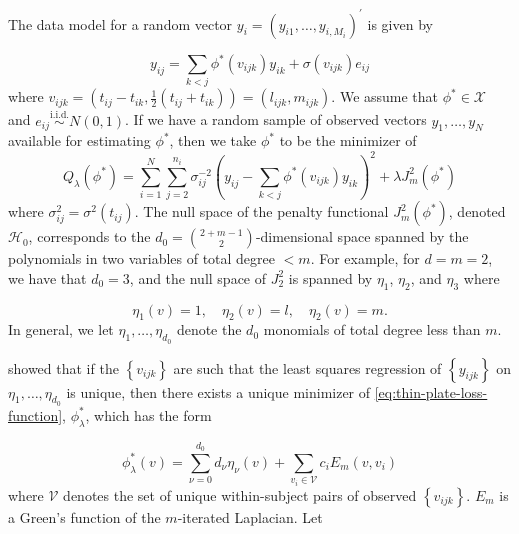 \documentclass[12pt]{article}
\newcommand{\Hilbert}{\mathcal{H}}
\theoremstyle{definition}
\begin{document}
\bigskip
The data model for a random vector $y_i = \left(y_{i1},\dots, y_{i,M_i} \right)^\prime$ is given by 

\begin{equation} \label{eq:functional-vc-ar-model}
y_{ij} = \sum_{k<j} \phi^*\left(v_{ijk}\right) y_{ik} + \sigma\left(v_{ijk}\right) e_{ij}
\end{equation}
\noindent
where $v_{ijk} = \left(t_{ij}-t_{ik}, \frac{1}{2}\left(t_{ij}+t_{ik}\right)\right) = \left(l_{ijk}, m_{ijk}\right)$. We assume that $\phi^* \in \mathcal{X}$ and $e_{ij} \stackrel{\text{i.i.d.}}{\sim} N\left(0,1\right)$. If we have a random sample of observed vectors $y_1,\dots,y_N$ available for estimating $\phi^*$, then we take $\phi^*$ to be the minimizer of
\begin{equation} \label{eq:thin-plate-loss-function}
Q_\lambda \left( \phi^* \right) = \sum_{i=1}^N \sum_{j=2}^{n_i} \sigma^{-2}_{ij}\left( y_{ij} - \sum_{k<j} \phi^*\left(v_{ijk}\right) y_{ik}  \right)^2 + \lambda J_m^2 \left( \phi^* \right)
\end{equation}
\noindent
where $\sigma^{2}_{ij} = \sigma^2\left(t_{ij}\right)$. The null space of the penalty functional $J_m^2 \left( \phi^* \right)$, denoted $\Hilbert_0$, corresponds to the $d_0={2+m-1 \choose 2}$-dimensional space spanned by the polynomials in two variables of total degree $< m$. For example, for $d=m=2$, we have that $d_0=3$, and the null space of $J^2_2$ is spanned by $\eta_1$, $\eta_2$, and $\eta_3$ where

\[
\eta_1\left(v\right) = 1,\quad \eta_2\left(v\right) = l, \quad \eta_2\left(v\right) = m.
\]
\noindent
In general, we let $\eta_1,\dots, \eta_{d_0}$ denote the $d_0$ monomials of total degree less than $m$.

\bigskip

\citet{duchon1977splines} showed that if the $\left\{ v_{ijk} \right\}$ are such that the least squares regression of $\left\{ y_{ijk}\right\}$ on $\eta_1,\dots, \eta_{d_0}$ is unique, then there exists a unique minimizer of \ref{eq:thin-plate-loss-function}, $\phi^*_\lambda$, which has the form

\begin{equation} \label{eq:unique-minimizer-of-loss}
\phi^*_\lambda\left( v \right) = \sum_{\nu=0}^{d_0} d_\nu \eta_\nu \left( v \right) + \sum_{v_i \in \mathcal{V}} c_{i} E_m\left(v,v_i \right)
\end{equation}
\noindent
where $\mathcal{V}$ denotes the set of unique within-subject pairs of observed $\left\{ v_{ijk} \right\}$. $E_m$ is a Green's function of the $m$-iterated Laplacian. Let
\end{document}
